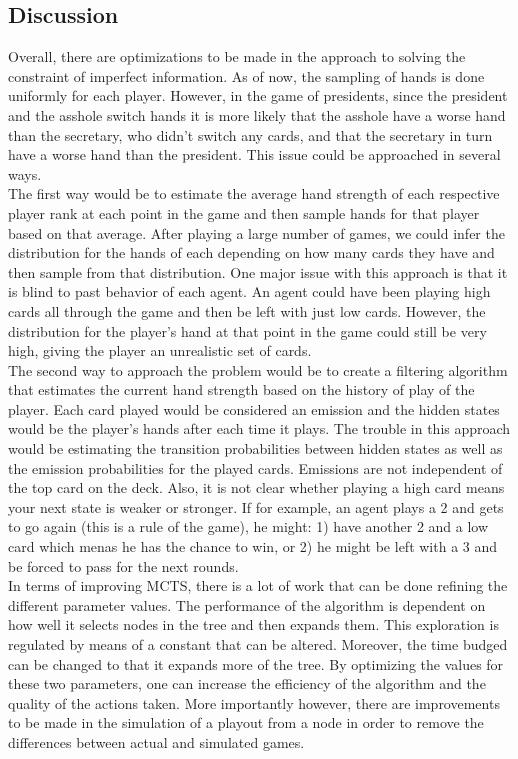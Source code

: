 \documentclass[11pt]{article}
\begin{document}
 
\subsection{Discussion}
Overall, there are optimizations to be made in the approach to solving the constraint of imperfect information. As of now, the sampling of hands is done uniformly for each player. However, in the game of presidents, since the president and the asshole switch hands it is more likely that the asshole have a worse hand than the secretary, who didn't switch any cards, and that the secretary in turn have a worse hand than the president. This issue could be approached in several ways.\\

The first way would be to estimate the average hand strength of each respective player rank at each point in the game and then sample hands for that player based on that average. After playing a large number of games, we could infer the distribution for the hands of each depending on how many cards they have and then sample from that distribution. One major issue with this approach is that it is blind to past behavior of each agent. An agent could have been playing high cards all through the game and then be left with just low cards. However, the distribution for the player's hand at that point in the game could still be very high, giving the player an unrealistic set of cards.\\

 The second way to approach the problem would be to create a filtering algorithm that estimates the current hand strength based on the history of play of the player. Each card played would be considered an emission and the hidden states would be the player's hands after each time it plays. The trouble in this approach would be estimating the transition probabilities between hidden states as well as the emission probabilities for the played cards. Emissions are not independent of the top card on the deck. Also, it is not clear whether playing a high card means your next state is weaker or stronger. If for example, an agent plays a 2 and gets to go again (this is a rule of the game), he might: 1) have another 2 and a low card which menas he has the chance to win, or 2) he might be left with a 3 and be forced to pass for the next rounds.\\

In terms of improving MCTS, there is a lot of work that can be done refining the different parameter values. The performance of the algorithm is dependent on how well it selects nodes in the tree and then expands them. This exploration is regulated by means of a constant that can be altered. Moreover, the time budged can be changed to that it expands more of the tree. By optimizing the values for these two parameters, one can increase the efficiency of the algorithm and the quality of the actions taken. More importantly however, there are improvements to be made in the simulation of a playout from a node in order to remove the differences between actual and simulated games.\\
\end{document}
